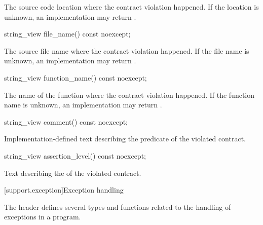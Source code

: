 \begin{itemdescr}
\pnum
\returns The source code location
where the contract violation happened.
If the location is unknown, an implementation may return .
\end{itemdescr}

%
\begin{itemdecl}
string_view file_name() const noexcept;
\end{itemdecl}

\begin{itemdescr}
\pnum
\returns The source file name
where the contract violation happened.
If the file name is unknown,
an implementation may return .
\end{itemdescr}

%
\begin{itemdecl}
string_view function_name() const noexcept;
\end{itemdecl}

\begin{itemdescr}
\pnum
\returns The name of the function
where the contract violation happened.
If the function name is unknown,
an implementation may return .
\end{itemdescr}

%
\begin{itemdecl}
string_view comment() const noexcept;
\end{itemdecl}

\begin{itemdescr}
\pnum
\returns Implementation-defined text describing
the predicate of the violated contract.
\end{itemdescr}

%
\begin{itemdecl}
string_view assertion_level() const noexcept;
\end{itemdecl}

\begin{itemdescr}
\pnum
\returns Text describing the 
of the violated contract.
\end{itemdescr}

[support.exception]{Exception handling}

\pnum
The header
defines several types and functions related to the handling of exceptions in a \Cpp{} program.

